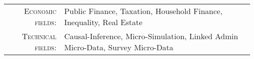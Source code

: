 %
%



\vspace{2.0 mm}

\begin{tabular}{rl}
    \textsc{Economic fields:} & Public Finance, Taxation, Household Finance, Inequality, Real Estate \\
    \textsc{Technical fields:} & Causal-Inference, Micro-Simulation, Linked Admin Micro-Data, Survey Micro-Data \\ 
\end{tabular}

\vspace{4 mm}